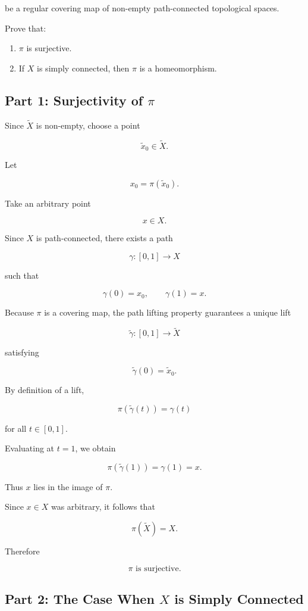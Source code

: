 \documentclass[12pt,a4paper]{article}
\theoremstyle{notespace}
\begin{document}
be a regular covering map of non-empty path-connected topological spaces.

Prove that:

\begin{enumerate}
	\item \(\pi\) is surjective.
	\item If \(X\) is simply connected, then \(\pi\) is a homeomorphism.
\end{enumerate}

\subsection{Part 1: Surjectivity of \(\pi\)}

Since \(\widetilde X\) is non-empty, choose a point

\[
\widetilde x_0\in\widetilde X.
\]

Let

\[
x_0=\pi(\widetilde x_0).
\]

Take an arbitrary point

\[
x\in X.
\]

Since \(X\) is path-connected, there exists a path

\[
\gamma:[0,1]\to X
\]

such that

\[
\gamma(0)=x_0,
\qquad
\gamma(1)=x.
\]

Because \(\pi\) is a covering map, the path lifting property guarantees a unique lift

\[
\widetilde\gamma:[0,1]\to\widetilde X
\]

satisfying

\[
\widetilde\gamma(0)=\widetilde x_0.
\]

By definition of a lift,

\[
\pi(\widetilde\gamma(t))
=
\gamma(t)
\]

for all \(t\in[0,1]\).

Evaluating at \(t=1\), we obtain

\[
\pi(\widetilde\gamma(1))
=
\gamma(1)
=
x.
\]

Thus \(x\) lies in the image of \(\pi\).

Since \(x\in X\) was arbitrary, it follows that

\[
\pi(\widetilde X)=X.
\]

Therefore

\[
\boxed{\pi \text{ is surjective}.}
\]

\subsection{Part 2: The Case When \(X\) is Simply Connected}
\end{document}
